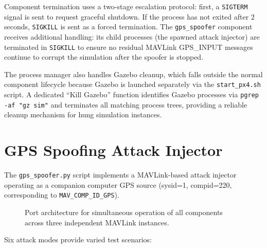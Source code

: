 Component termination uses a two-stage escalation protocol: first, a \texttt{SIGTERM} signal is sent to request graceful shutdown. If the process has not exited after 2 seconds, \texttt{SIGKILL} is sent as a forced termination. The \texttt{gps\_spoofer} component receives additional handling: its child processes (the spawned attack injector) are terminated in \texttt{SIGKILL} to ensure no residual MAVLink GPS\_INPUT messages continue to corrupt the simulation after the spoofer is stopped.

The process manager also handles Gazebo cleanup, which falls outside the normal component lifecycle because Gazebo is launched separately via the \texttt{start\_px4.sh} script. A dedicated ``Kill Gazebo'' function identifies Gazebo processes via \texttt{pgrep -af "gz sim"} and terminates all matching process trees, providing a reliable cleanup mechanism for hung simulation instances.

\section{GPS Spoofing Attack Injector}

The \texttt{gps\_spoofer.py} script implements a MAVLink-based attack injector operating as a companion computer GPS source (sysid=1, compid=220, corresponding to \texttt{MAV\_COMP\_ID\_GPS}).

\begin{figure}[H]
\centering
\footnotesize
{}
\caption{Port architecture for simultaneous operation of all components across three independent MAVLink instances.}
\label{fig:port_architecture}
\end{figure} Six attack modes provide varied test scenarios:


